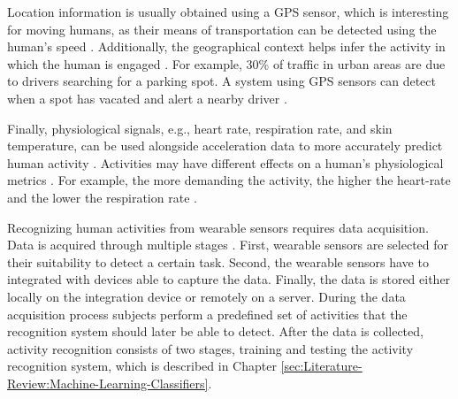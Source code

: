 \par Location information is usually obtained using a GPS sensor, which is interesting for moving humans, as their means of transportation can be detected using the human's speed \cite{Zheng2008}. Additionally, the geographical context helps infer the activity in which the human is engaged \cite{liao2006location}. For example, 30\% of traffic in urban areas are due to drivers searching for a parking spot. A system using GPS sensors can detect when a spot has vacated and alert a nearby driver \cite{Nawaz:2013}.
\par Finally, physiological signals, e.g., heart rate, respiration rate, and skin temperature, can be used alongside acceleration data to more accurately predict human activity \cite{Lara2012}. Activities may have different effects on a human's physiological metrics \cite{Lara2013}. For example, the more demanding the activity, the higher the heart-rate and the lower the respiration rate \cite{Lara2013}.
\par Recognizing human activities from wearable sensors requires data acquisition. Data is acquired through multiple stages \cite{Lara2013}. First, wearable sensors are selected for their suitability to detect a certain task. Second, the wearable sensors have to integrated with devices able to capture the data. Finally, the data is stored either locally on the integration device or remotely on a server. During the data acquisition process subjects perform a predefined set of activities that the recognition system should later be able to detect. After the data is collected, activity recognition consists of two stages, training and testing the activity recognition system, which is described in Chapter \ref{sec:Literature-Review:Machine-Learning-Classifiers}.

